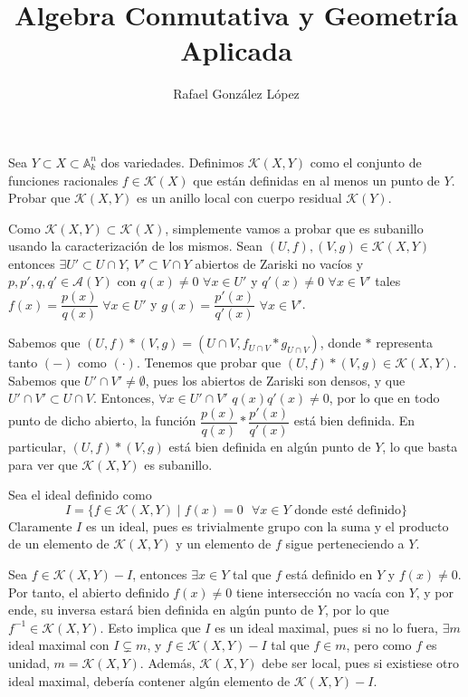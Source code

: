 \documentclass[twoside]{article}
\begin{document}
\title{Algebra Conmutativa y Geometría Aplicada}
\author{Rafael González López}
\maketitle

\begin{ejercicio}{6}
Sea $Y\subset X \subset \mathbb{A}_k^n$ dos variedades. Definimos $\mathcal{K}(X,Y)$ como el conjunto de funciones racionales $f \in \mathcal{K}(X)$ que están definidas en al menos un punto de $Y$. Probar que $\mathcal{K}(X,Y)$ es un anillo local con cuerpo residual $\mathcal{K}(Y)$.
\begin{solucion}
Como $\mathcal{K}(X,Y)\subset \mathcal{K}(X)$, simplemente vamos a probar que es subanillo usando la caracterización de los mismos. Sean $(U,f),(V,g)\in \mathcal{K}(X,Y)$ entonces $\exists U'\subset U\cap Y$, $V'\subset V\cap Y$ abiertos de Zariski no vacíos y $p,p',q,q'\in\mathcal{A}(Y)$ con $q(x)\neq 0$ $\forall x \in U'$ y $q'(x)\neq 0$ $\forall x \in V'$ tales $f(x)=\dfrac{p(x)}{q(x)}$ $\forall x\in U'$ y $g(x)=\dfrac{p'(x)}{q'(x)}$ $\forall x\in V'$. 

Sabemos que $(U,f)\ast (V,g) = (U\cap V, f_{U\cap V}\ast g_{U\cap V})$, donde $\ast$ representa tanto $(-)$ como $(\cdot)$. Tenemos que probar que $(U,f)\ast (V,g) \in \mathcal{K}(X,Y)$. Sabemos que $U'\cap V' \neq \emptyset$, pues los abiertos de Zariski son densos, y que $U'\cap V' \subset U\cap V$. Entonces, $\forall x \in U'\cap V'$ $q(x)q'(x)\neq 0$, por lo que en todo punto de dicho abierto, la función $\dfrac{p(x)}{q(x)}\ast\dfrac{p'(x)}{q'(x)}$ está bien definida. En particular, $(U,f)\ast (V,g)$ está bien definida en algún punto de $Y$, lo que basta para ver que $\mathcal{K}(X,Y)$ es subanillo.

Sea el ideal definido como
$$
I = \{f \in \mathcal{K}(X,Y) \mid \text{$f(x)=0$ $\forall x \in Y$ donde esté definido}\}
$$
Claramente $I$ es un ideal, pues es trivialmente grupo con la suma y el producto de un elemento de $\mathcal{K}(X,Y)$ y un elemento de $f$ sigue perteneciendo a $Y$. 

Sea $f\in \mathcal{K}(X,Y)-I$, entonces $\exists x \in Y$ tal que $f$ está definido en $Y$ y $f(x)\neq 0$. Por tanto, el abierto definido $f(x)\neq 0$ tiene intersección no vacía con $Y$, y por ende, su inversa estará bien definida en algún punto de $Y$, por lo que $f^{-1}\in \mathcal{K}(X,Y)$. Esto implica que $I$ es un ideal maximal, pues si no lo fuera, $\exists m$ ideal maximal con $I \subsetneq m$, y  $f\in \mathcal{K}(X,Y)-I$ tal que $f\in m$, pero como $f$ es unidad, $m = \mathcal{K}(X,Y)$. Además, $\mathcal{K}(X,Y)$ debe ser local, pues si existiese otro ideal maximal, debería contener algún elemento de $\mathcal{K}(X,Y)-I$.


\end{solucion}
\end{ejercicio}
\end{document}
